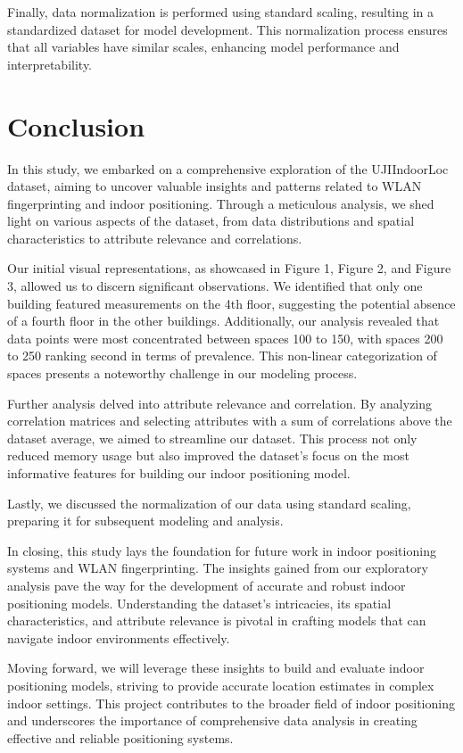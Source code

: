 \documentclass[conference]{IEEEtran}
\begin{document}
Finally, data normalization is performed using standard scaling, resulting in a standardized dataset for model development. This normalization process ensures that all variables have similar scales, enhancing model performance and interpretability.


\section*{Conclusion}

In this study, we embarked on a comprehensive exploration of the UJIIndoorLoc dataset, aiming to uncover valuable insights and patterns related to WLAN fingerprinting and indoor positioning. Through a meticulous analysis, we shed light on various aspects of the dataset, from data distributions and spatial characteristics to attribute relevance and correlations.

Our initial visual representations, as showcased in Figure 1, Figure 2, and Figure 3, allowed us to discern significant observations. We identified that only one building featured measurements on the 4th floor, suggesting the potential absence of a fourth floor in the other buildings. Additionally, our analysis revealed that data points were most concentrated between spaces 100 to 150, with spaces 200 to 250 ranking second in terms of prevalence. This non-linear categorization of spaces presents a noteworthy challenge in our modeling process.

Further analysis delved into attribute relevance and correlation. By analyzing correlation matrices and selecting attributes with a sum of correlations above the dataset average, we aimed to streamline our dataset. This process not only reduced memory usage but also improved the dataset's focus on the most informative features for building our indoor positioning model.

Lastly, we discussed the normalization of our data using standard scaling, preparing it for subsequent modeling and analysis.

In closing, this study lays the foundation for future work in indoor positioning systems and WLAN fingerprinting. The insights gained from our exploratory analysis pave the way for the development of accurate and robust indoor positioning models. Understanding the dataset's intricacies, its spatial characteristics, and attribute relevance is pivotal in crafting models that can navigate indoor environments effectively.

Moving forward, we will leverage these insights to build and evaluate indoor positioning models, striving to provide accurate location estimates in complex indoor settings. This project contributes to the broader field of indoor positioning and underscores the importance of comprehensive data analysis in creating effective and reliable positioning systems.
\end{document}
